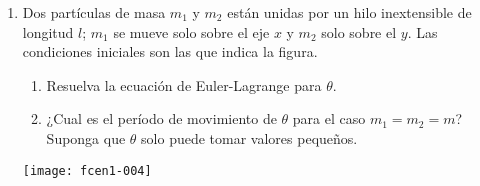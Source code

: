 \documentclass[11pt,spanish,a4paper]{article}
\begin{document}
\begin{enumerate}
\item \begin{minipage}[t][4.5cm]{0.6\textwidth}
Dos partículas de masa \(m_1\) y \(m_2\) están unidas por un hilo inextensible de longitud \(l\); \(m_1\) se mueve solo sobre el eje \(x\) y \(m_2\) solo sobre el \(y\).
Las condiciones iniciales son las que indica la figura.
	\begin{enumerate}
		\item Resuelva la ecuación de Euler-Lagrange para \(\theta\).
		\item ¿Cual es el período de movimiento de \(\theta\) para el caso \(m_1 = m_2 = m\)?
Suponga que \(\theta\) solo puede tomar valores pequeños.
  \end{enumerate}
\end{minipage}
\begin{minipage}[c][2em][t]{0.4\textwidth}
	\hspace{0.5cm}
   \texttt{[image: fcen1-004]}
\end{minipage}


%


\end{enumerate}
\end{document}
